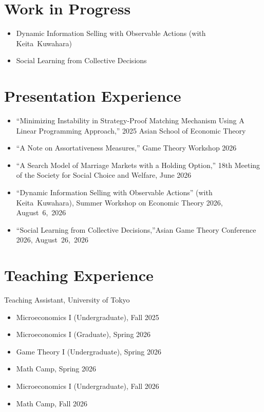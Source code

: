 \documentclass[11pt,a4paper]{article}
\begin{document}
\section*{Work in Progress}
\begin{itemize}
    \item Dynamic Information Selling with Observable Actions (with \mbox{Keita Kuwahara})
    \item Social Learning from Collective Decisions
\end{itemize}

\newpage

\section*{Presentation Experience}
\begin{itemize}
    \item ``Minimizing Instability in Strategy-Proof Matching Mechanism Using A Linear Programming Approach,'' 2025 Asian School of Economic Theory
    \item ``A Note on Assortativeness Measures,'' Game Theory Workshop 2026
    \item ``A Search Model of Marriage Markets with a Holding Option,'' 18th Meeting of the Society for Social Choice and Welfare, June 2026
    \item ``Dynamic Information Selling with Observable Actions'' (with \mbox{Keita Kuwahara}), Summer Workshop on Economic Theory 2026, \mbox{August 6, 2026}
    \item ``Social Learning from Collective Decisions,''\newline Asian Game Theory Conference 2026, \mbox{August 26, 2026}
\end{itemize}

\section*{Teaching Experience}
\noindent Teaching Assistant, University of Tokyo
\begin{itemize}
    \item Microeconomics I (Undergraduate), Fall 2025
    \item Microeconomics I (Graduate), Spring 2026
    \item Game Theory I (Undergraduate), Spring 2026
    \item Math Camp, Spring 2026
    \item Microeconomics I (Undergraduate), Fall 2026
    \item Math Camp, Fall 2026
\end{itemize}
\end{document}
